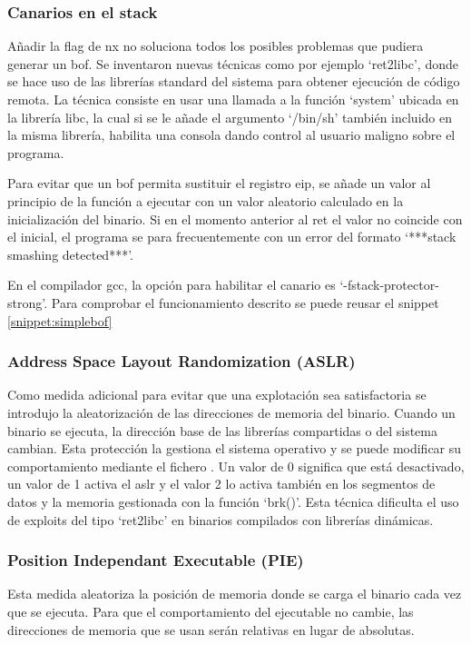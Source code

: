 \subsubsection{Canarios en el stack}
Añadir la flag de \acrshort{nx} no soluciona todos los posibles problemas que pudiera generar un \acrshort{bof}.
Se inventaron nuevas técnicas como por ejemplo `ret2libc', donde se hace uso de las librerías standard del sistema para obtener ejecución de código remota.
La técnica consiste en usar una llamada a la función `system' ubicada en la librería \acrshort{libc}, la cual si se le añade el argumento `/bin/sh' también incluido en la misma librería, habilita una consola dando control al usuario maligno sobre el programa.

Para evitar que un \acrshort{bof} permita sustituir el registro \acrshort{eip}, se añade un valor al principio de la función a ejecutar con un valor aleatorio calculado en la inicialización del binario.
Si en el momento anterior al \acrfull{ret} el valor no coincide con el inicial, el programa se para frecuentemente con un error del formato `***stack smashing detected***'.

En el compilador \acrshort{gcc}, la opción para habilitar el canario es `-fstack-protector-strong'.
Para comprobar el funcionamiento descrito se puede reusar el snippet \ref{snippet:simplebof}
\subsubsection{Address Space Layout Randomization (ASLR)}
Como medida adicional para evitar que una explotación sea satisfactoria se introdujo la aleatorización de las direcciones de memoria del binario.
Cuando un binario se ejecuta, la dirección base de las librerías compartidas o del sistema cambian.
Esta protección la gestiona el sistema operativo y se puede modificar su comportamiento mediante el fichero .
Un valor de 0 significa que está desactivado, un valor de 1 activa el \acrshort{aslr} y el valor 2 lo activa también en los segmentos de datos y la memoria gestionada con la función `brk()'.
Esta técnica dificulta el uso de exploits del tipo `ret2libc' en binarios compilados con librerías dinámicas.
\subsubsection{Position Independant Executable (PIE)}
Esta medida aleatoriza la posición de memoria donde se carga el binario cada vez que se ejecuta.
Para que el comportamiento del ejecutable no cambie, las direcciones de memoria que se usan serán relativas en lugar de absolutas.
